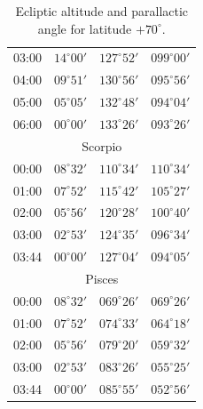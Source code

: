 \begin{table}[!h]
\begin{Parallel}{}{}
{{\begin{tabular}{l|lll}
03:00 & $14^\circ 00'$ & $127^\circ 52'$& $099^\circ 00'$ \\
04:00 & $09^\circ 51'$ & $130^\circ 56'$& $095^\circ 56'$ \\
05:00 & $05^\circ 05'$ & $132^\circ 48'$& $094^\circ 04'$ \\
06:00 & $00^\circ 00'$ & $133^\circ 26'$& $093^\circ 26'$ \\
\multicolumn{4}{c}{Scorpio}\\
00:00 & $08^\circ 32'$ & $110^\circ 34'$& $110^\circ 34'$ \\
01:00 & $07^\circ 52'$ & $115^\circ 42'$& $105^\circ 27'$ \\
02:00 & $05^\circ 56'$ & $120^\circ 28'$& $100^\circ 40'$ \\
03:00 & $02^\circ 53'$ & $124^\circ 35'$& $096^\circ 34'$ \\
03:44 & $00^\circ 00'$ & $127^\circ 04'$& $094^\circ 05'$ \\
\multicolumn{4}{c}{Pisces}\\
00:00 & $08^\circ 32'$ & $069^\circ 26'$& $069^\circ 26'$ \\
01:00 & $07^\circ 52'$ & $074^\circ 33'$& $064^\circ 18'$ \\
02:00 & $05^\circ 56'$ & $079^\circ 20'$& $059^\circ 32'$ \\
03:00 & $02^\circ 53'$ & $083^\circ 26'$& $055^\circ 25'$ \\
03:44 & $00^\circ 00'$ & $085^\circ 55'$& $052^\circ 56'$ \\
\end{tabular}
}}
\end{Parallel}
\caption{Ecliptic altitude and parallactic angle for latitude $+70^\circ$.}
\end{table}

